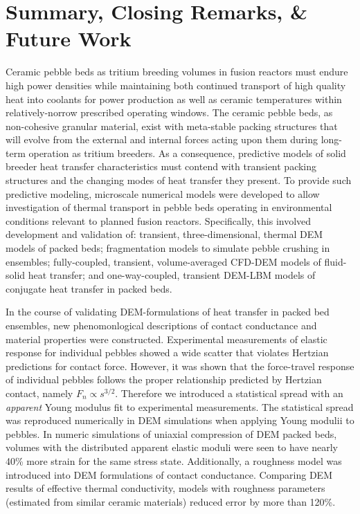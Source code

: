 \chapter{Summary, Closing Remarks, \& Future Work}\label{sec:summary}
Ceramic pebble beds as tritium breeding volumes in fusion reactors must endure high power densities while maintaining both continued transport of high quality heat into coolants for power production as well as ceramic temperatures within relatively-norrow prescribed operating windows. The ceramic pebble beds, as non-cohesive granular material, exist with meta-stable packing structures that will evolve from the external and internal forces acting upon them during long-term operation as tritium breeders. As a consequence, predictive models of solid breeder heat transfer characteristics must contend with transient packing structures and the changing modes of heat transfer they present. To provide such predictive modeling, microscale numerical models were developed to allow investigation of thermal transport in pebble beds operating in environmental conditions relevant to planned fusion reactors. Specifically, this involved development and validation of: transient, three-dimensional, thermal DEM models of packed beds; fragmentation models to simulate pebble crushing in ensembles; fully-coupled, transient, volume-averaged CFD-DEM models of fluid-solid heat transfer; and one-way-coupled, transient DEM-LBM models of conjugate heat transfer in packed beds. %

In the course of validating DEM-formulations of heat transfer in packed bed ensembles, new phenomonlogical descriptions of contact conductance and material properties were constructed. Experimental measurements of elastic response for individual pebbles showed a wide scatter that violates Hertzian predictions for contact force. However, it was shown that the force-travel response of individual pebbles follows the proper relationship predicted by Hertzian contact, namely $F_n \propto s^{3/2}$. Therefore we introduced a statistical spread with an \textit{apparent} Young modulus fit to experimental measurements. The statistical spread was reproduced numerically in DEM simulations when applying Young modulii to pebbles. In numeric simulations of uniaxial compression of DEM packed beds, volumes with the distributed apparent elastic moduli were seen to have nearly 40\% more strain for the same stress state. Additionally, a roughness model was introduced into DEM formulations of contact conductance. Comparing DEM results of effective thermal conductivity, models with roughness parameters (estimated from similar ceramic materials) reduced error by more than 120\%. 

